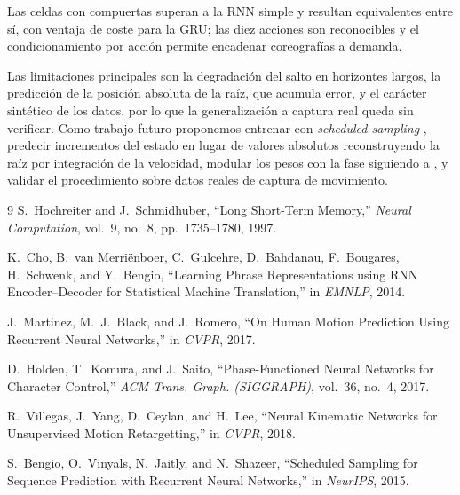 \documentclass[10pt,twocolumn]{article}
\begin{document}
Las celdas con compuertas superan a la RNN simple y resultan equivalentes entre
sí, con ventaja de coste para la GRU; las diez acciones son reconocibles y el
condicionamiento por acción permite encadenar coreografías a demanda.

Las limitaciones principales son la degradación del salto en horizontes largos,
la predicción de la posición absoluta de la raíz, que acumula error, y el carácter
sintético de los datos, por lo que la generalización a captura real queda sin
verificar. Como trabajo futuro proponemos entrenar con \emph{scheduled sampling}
\cite{scheduled}, predecir incrementos del estado en lugar de valores absolutos
reconstruyendo la raíz por integración de la velocidad, modular los pesos con la
fase siguiendo a \cite{pfnn}, y validar el procedimiento sobre datos reales de
captura de movimiento.

\begin{thebibliography}{9}\footnotesize
{} S.~Hochreiter and J.~Schmidhuber, ``Long Short-Term Memory,''
\emph{Neural Computation}, vol.~9, no.~8, pp.~1735--1780, 1997.

 K.~Cho, B.~van Merriënboer, C.~Gulcehre, D.~Bahdanau, F.~Bougares,
H.~Schwenk, and Y.~Bengio, ``Learning Phrase Representations using RNN
Encoder--Decoder for Statistical Machine Translation,'' in \emph{EMNLP}, 2014.

 J.~Martinez, M.~J.~Black, and J.~Romero, ``On Human Motion
Prediction Using Recurrent Neural Networks,'' in \emph{CVPR}, 2017.

 D.~Holden, T.~Komura, and J.~Saito, ``Phase-Functioned Neural
Networks for Character Control,'' \emph{ACM Trans. Graph. (SIGGRAPH)}, vol.~36,
no.~4, 2017.

 R.~Villegas, J.~Yang, D.~Ceylan, and H.~Lee, ``Neural Kinematic
Networks for Unsupervised Motion Retargetting,'' in \emph{CVPR}, 2018.

 S.~Bengio, O.~Vinyals, N.~Jaitly, and N.~Shazeer,
``Scheduled Sampling for Sequence Prediction with Recurrent Neural Networks,'' in
\emph{NeurIPS}, 2015.
\end{thebibliography}
\end{document}
